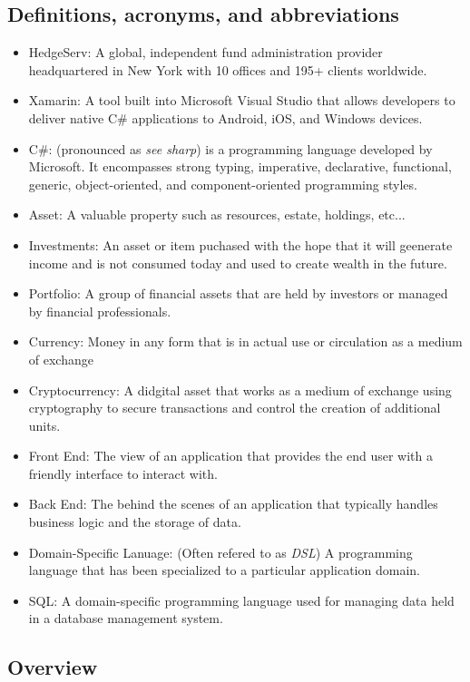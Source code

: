 \documentclass[onecolumn, draftclsnofoot,10pt, compsoc]{IEEEtran}
\begin{document}
\subsection{Definitions, acronyms, and abbreviations}
\begin{itemize}
	\item HedgeServ: A global, independent fund administration provider headquartered in New York with
		10 offices and 195+ clients worldwide.
	\item Xamarin: A tool built into Microsoft Visual Studio that allows developers to deliver native 
	   	C# applications to Android, iOS, and Windows devices.
	\item C#: (pronounced as \textit{see sharp}) is a programming language developed by Microsoft. It encompasses strong typing, imperative, declarative, functional, generic,
		object-oriented, and component-oriented programming styles.
	\item Asset: A valuable property such as resources, estate, holdings, etc...
	\item Investments: An asset or item puchased with the hope that it will geenerate income and is not consumed today and used to create wealth in the future.
	\item Portfolio: A group of financial assets that are held by investors or managed by financial professionals.
	\item Currency: Money in any form that is in actual use or circulation as a medium of exchange
	\item Cryptocurrency: A didgital asset that works as a medium of  exchange using cryptography to secure transactions and control the creation of additional units.
	\item Front End: The view of an application that provides the end user with a friendly interface to interact with.
	\item Back End: The behind the scenes of an application that typically handles business logic and the storage of data.
	\item Domain-Specific Lanuage: (Often refered to as \textit{DSL}) A programming language that has been specialized to a particular application domain.
	\item SQL: A domain-specific programming language used for managing data held in a database management system.
\end{itemize}

\subsection{Overview}
\end{document}
